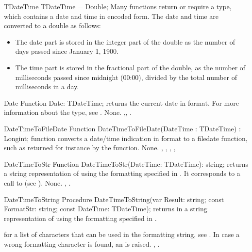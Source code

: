 \begin{type}{TDateTime}
\Declaration
  TDateTime = Double;
\Description
Many functions return or require a  type, which contains
a date and time in encoded form. The date and time are converted to a double
as follows:
\begin{itemize}
\item The date part is stored in the integer part of the double as the
number of days passed since January 1, 1900.
\item The time part is stored in the fractional part of the double, as 
the number of milliseconds passed since midnight (00:00), divided by the
total number of milliseconds in a day.
\end{itemize}
\end{type}

\begin{function}{Date}
\Declaration
Function Date: TDateTime;
\Description
{} returns the current date in  format. 
For more information about the  type, see .
\Errors
None.
\SeeAlso
{},, .
\end{function}



\begin{function}{DateTimeToFileDate}
\Declaration
Function DateTimeToFileDate(DateTime : TDateTime) : Longint;
\Description
{} function converts a date/time indication in
 format to a filedate function, such as returned for 
instance by the  function.
\Errors
None.
\SeeAlso
{}, , ,
, 
\end{function}


 
\begin{function}{DateTimeToStr}
\Declaration
Function DateTimeToStr(DateTime: TDateTime): string;
\Description
{} returns a string representation of 
 using the formatting specified in
. It corresponds to a call to 
 (see ).
\Errors
None.
\SeeAlso
{}, .
\end{function}


 
\begin{procedure}{DateTimeToString}
\Declaration
Procedure DateTimeToString(var Result: string; const FormatStr: string; const DateTime: TDateTime);
\Description
{} returns in  a string representation of 
 using the formatting specified in . 

for a list of characters that can be used in the  formatting
string, see .
\Errors
In case a wrong formatting character is found, an  is
raised.
\SeeAlso
{}, .
\end{procedure}


